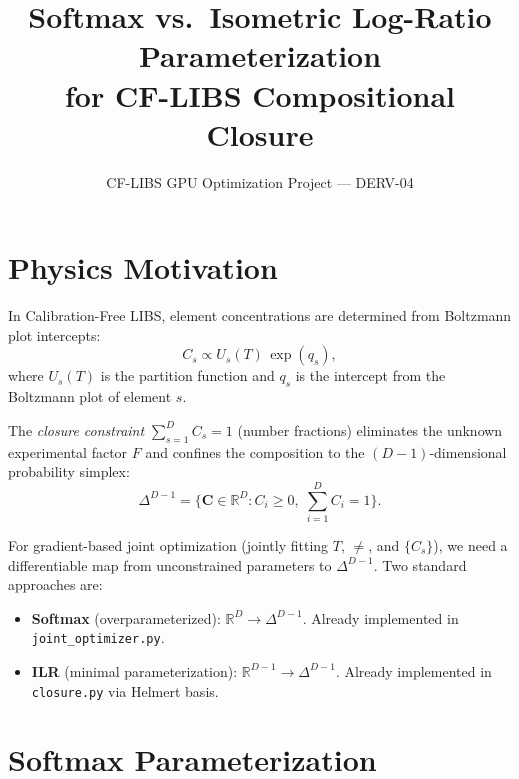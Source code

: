\documentclass[11pt]{article}
\title{Softmax vs.\ Isometric Log-Ratio Parameterization\\
for CF-LIBS Compositional Closure}
\author{CF-LIBS GPU Optimization Project --- DERV-04}
\date{}
\newcommand{\CC}{\mathbf{C}}
\begin{document}
\maketitle

\section{Physics Motivation}
\label{sec:motivation}

In Calibration-Free LIBS, element concentrations are determined from
Boltzmann plot intercepts:
%
\begin{equation}
  \label{eq:raw-concentration}
  C_s \propto U_s(T)\,\exp(q_s),
\end{equation}
%
where $U_s(T)$ is the partition function and $q_s$ is the intercept
from the Boltzmann plot of element $s$.

The \emph{closure constraint} $\sum_{s=1}^D C_s = 1$ (number fractions)
eliminates the unknown experimental factor $F$ and confines the
composition to the $(D{-}1)$-dimensional probability simplex:
%
\begin{equation}
  \label{eq:simplex}
  \Delta^{D-1}
  = \bigl\{\CC \in \mathbb{R}^D : C_i \ge 0,\;\textstyle\sum_{i=1}^D C_i = 1\bigr\}.
\end{equation}
%

For gradient-based joint optimization (jointly fitting $T$, $\ne$, and
$\{C_s\}$), we need a differentiable map from unconstrained parameters
to $\Delta^{D-1}$.  Two standard approaches are:

\begin{itemize}
  \item \textbf{Softmax} (overparameterized): $\mathbb{R}^D \to \Delta^{D-1}$.
    Already implemented in \texttt{joint\_optimizer.py}.
  \item \textbf{ILR} (minimal parameterization):
    $\mathbb{R}^{D-1} \to \Delta^{D-1}$.
    Already implemented in \texttt{closure.py} via Helmert basis.
\end{itemize}


\section{Softmax Parameterization}
\label{sec:softmax}
\end{document}
